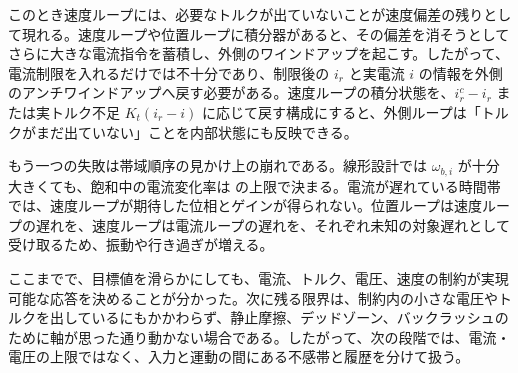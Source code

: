 このとき速度ループには、必要なトルクが出ていないことが速度偏差の残りとして現れる。速度ループや位置ループに積分器があると、その偏差を消そうとしてさらに大きな電流指令を蓄積し、外側のワインドアップを起こす。したがって、電流制限を入れるだけでは不十分であり、制限後の $i_r$ と実電流 $i$ の情報を外側のアンチワインドアップへ戻す必要がある。速度ループの積分状態を、$i_r^c-i_r$ または実トルク不足 $K_t(i_r-i)$ に応じて戻す構成にすると、外側ループは「トルクがまだ出ていない」ことを内部状態にも反映できる。

もう一つの失敗は帯域順序の見かけ上の崩れである。線形設計では $\omega_{b,i}$ が十分大きくても、飽和中の電流変化率は  の上限で決まる。電流が遅れている時間帯では、速度ループが期待した位相とゲインが得られない。位置ループは速度ループの遅れを、速度ループは電流ループの遅れを、それぞれ未知の対象遅れとして受け取るため、振動や行き過ぎが増える。

ここまでで、目標値を滑らかにしても、電流、トルク、電圧、速度の制約が実現可能な応答を決めることが分かった。次に残る限界は、制約内の小さな電圧やトルクを出しているにもかかわらず、静止摩擦、デッドゾーン、バックラッシュのために軸が思った通り動かない場合である。したがって、次の段階では、電流・電圧の上限ではなく、入力と運動の間にある不感帯と履歴を分けて扱う。

